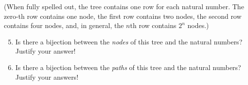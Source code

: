 \documentclass[12pt,a4paper]{article}
\begin{document}
(When fully spelled out, the tree contains one row for each natural number. The zero-th row contains one node, the first row contains two nodes, the second row contains four nodes, and, in general, the $n$th row contains $2^n$ nodes.)

\begin{enumerate} 
\setcounter{enumi}{4}

\item Is there a bijection between the \emph{nodes} of this tree and the natural numbers? Justify your answer!

\item Is there a bijection between the \emph{paths} of this tree and the natural numbers? Justify your answers!


\end{enumerate}






\end{document}
